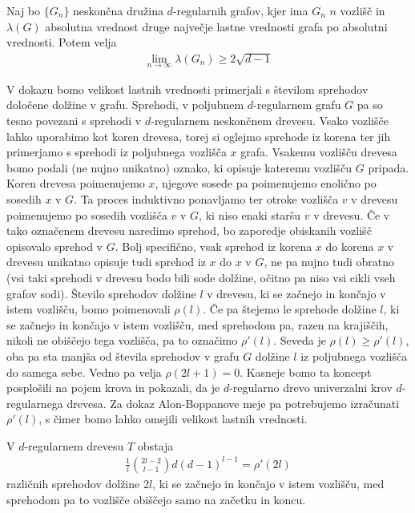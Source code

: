 \begin{izrek}
    \label{alon-boppanova-meja-izrek}
    Naj bo \(\{G_n\}\) neskončna družina \(d\)-regularnih grafov, kjer ima \(G_n\) \(n\) vozlišč in \(\lambda(G)\) absolutna vrednost druge največje lastne vrednosti grafa po absolutni vrednosti. Potem velja
    \begin{align*}
        \lim_{n\to\infty} \lambda(G_n) \geq 2\sqrt{d-1}
    \end{align*}
\end{izrek}
V dokazu bomo velikost lastnih vrednosti primerjali s številom sprehodov določene dolžine v grafu. Sprehodi, v poljubnem \(d\)-regularnem grafu \(G\) pa so tesno povezani s sprehodi v \(d\)-regularnem neskončnem drevesu. Vsako vozlišče lahko uporabimo kot koren drevesa, torej si oglejmo sprehode iz korena ter jih primerjamo s sprehodi iz poljubnega vozlišča \(x\) grafa. Vsakemu vozlišču drevesa bomo podali (ne nujno unikatno) oznako, ki opisuje kateremu vozlišču \(G\) pripada. Koren drevesa poimenujemo \(x\), njegove sosede pa poimenujemo enolično po sosedih \(x\) v \(G\). Ta proces induktivno ponavljamo ter otroke vozlišča \(v\) v drevesu poimenujemo po sosedih vozlišča \(v\) v \(G\), ki niso enaki staršu \(v\) v drevesu. Če v tako označenem drevesu naredimo sprehod, bo zaporedje obiskanih vozlišč opisovalo sprehod v \(G\). Bolj specifično, vsak sprehod iz korena \(x\) do korena \(x\) v drevesu unikatno opisuje tudi sprehod iz \(x\) do \(x\) v \(G\), ne pa nujno tudi obratno (vsi taki sprehodi v drevesu bodo bili sode dolžine, očitno pa niso vsi cikli vseh grafov sodi). Število sprehodov dolžine \(l\) v drevesu, ki se začnejo in končajo v istem vozlišču, bomo poimenovali \(\rho(l)\). Če pa štejemo le sprehode dolžine \(l\), ki se začnejo in končajo v istem vozlišču, med sprehodom pa, razen na krajiščih, nikoli ne obiščejo tega vozlišča, pa to označimo \(\rho'(l)\). Seveda je \(\rho(l)\geq \rho'(l)\), oba pa sta manjša od števila sprehodov v grafu \(G\) dolžine \(l\) iz poljubnega vozlišča do samega sebe. Vedno pa velja \(\rho(2l+1)=0\). Kasneje bomo ta koncept posplošili na pojem krova in pokazali, da je \(d\)-regularno drevo univerzalni krov \(d\)-regularnega drevesa. Za dokaz Alon-Boppanove meje pa potrebujemo izračunati \(\rho'(l)\), s čimer bomo lahko omejili velikost lastnih vrednosti\cite{polatajko}.
\begin{lema}\label{alon:drevesa-meja}
    V \(d\)-regularnem drevesu \(T\) obstaja
    \begin{align*}
        \frac{1}{l}\binom{2l-2}{l-1}d(d-1)^{l-1} = \rho'(2l)
    \end{align*}
    različnih sprehodov dolžine \(2l\), ki se začnejo in končajo v istem vozlišču, med sprehodom pa to vozlišče obiščejo samo na začetku in koncu.
\end{lema}
